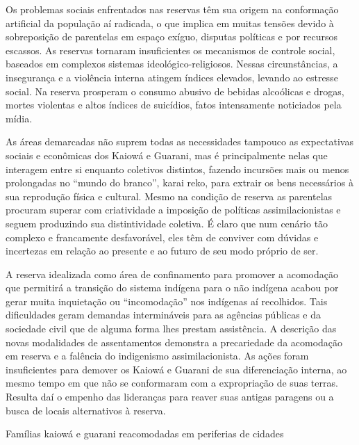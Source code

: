 \documentclass{article}
\begin{document}
Os problemas sociais enfrentados nas reservas t\^em sua origem na
conforma\c{c}\~ao artificial da popula\c{c}\~ao a\'i radicada, o que
implica em muitas tens\~oes devido \`a sobreposi\c{c}\~ao de parentelas
em espa\c{c}o ex\'iguo, disputas pol\'iticas e por recursos escassos.
As reservas tornaram insuficientes os mecanismos de controle social,
baseados em complexos sistemas ideol\'ogico-religiosos. Nessas
circunst\^ancias, a inseguran\c{c}a e a viol\^encia interna atingem
\'indices elevados, levando ao estresse social. Na reserva prosperam o
consumo abusivo de bebidas alco\'olicas e drogas, mortes violentas e
altos \'indices de suic\'idios, fatos intensamente noticiados pela
m\'idia.

As \'areas demarcadas n\~ao suprem todas as necessidades tampouco as
expectativas sociais e econ\^omicas dos Kaiow\'a e Guarani, mas \'e
principalmente nelas que interagem entre si enquanto coletivos
distintos, fazendo incurs\~oes mais ou menos prolongadas no
{\textquotedblleft}mundo do branco{\textquotedblright}, karai reko,
para extrair os bens necess\'arios \`a sua reprodu\c{c}\~ao f\'isica e
cultural. Mesmo na condi\c{c}\~ao de reserva as parentelas procuram
superar com criatividade a imposi\c{c}\~ao de pol\'iticas
assimilacionistas e seguem produzindo sua distintividade coletiva. \'E
claro que num cen\'ario t\~ao complexo e francamente desfavor\'avel,
eles t\^em de conviver com d\'uvidas e incertezas em rela\c{c}\~ao ao
presente e ao futuro de seu modo pr\'oprio de ser. 

A reserva idealizada como \'area de confinamento para promover a
acomoda\c{c}\~ao que permitir\'a a transi\c{c}\~ao do sistema
ind\'igena para o n\~ao ind\'igena acabou por gerar muita
inquieta\c{c}\~ao ou
{\textquotedblleft}incomoda\c{c}\~ao{\textquotedblright} nos
ind\'igenas a\'i recolhidos. Tais dificuldades geram demandas
intermin\'aveis para as ag\^encias p\'ublicas e da sociedade civil que
de alguma forma lhes prestam assist\^encia. A descri\c{c}\~ao das novas
modalidades de assentamentos demonstra a precariedade da
acomoda\c{c}\~ao em reserva e a fal\^encia do indigenismo
assimilacionista. As a\c{c}\~oes foram insuficientes para demover os
Kaiow\'a e Guarani de sua diferencia\c{c}\~ao interna, ao mesmo tempo
em que n\~ao se conformaram com a expropria\c{c}\~ao de suas terras.
Resulta da\'i o empenho das lideran\c{c}as para reaver suas antigas
paragens ou a busca de locais alternativos \`a reserva.

Fam\'ilias kaiow\'a e guarani reacomodadas em periferias de cidades
\end{document}
